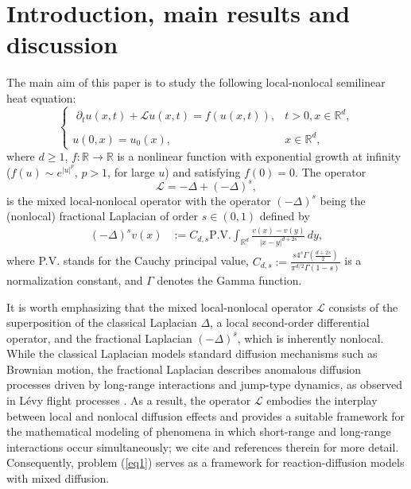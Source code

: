 \documentclass[a4paper,11pt]{amsart}
\renewcommand\eqref[1]{(\ref{#1})} %
\numberwithin{equation}{section}
\theoremstyle{plain}
\theoremstyle{definition}
\begin{document}
\section{Introduction, main results and discussion}
The main aim of this paper is to study the following local-nonlocal semilinear heat equation: 
\begin{equation}\label{eq1}
\left\{\begin{array}{ll}
\,\, \displaystyle {\partial_tu(x, t)+\mathcal L u(x, t) =f(u(x, t)),} &\displaystyle {t>0,x\in {\mathbb{R}^d},}\\
{}\\
\displaystyle{u(0,x)=  u_0(x),\qquad\qquad}&\displaystyle{x\in {\mathbb{R}^d},}
\end{array}
\right.
\end{equation} 
where $d\geq 1$, $f:\mathbb{R}\rightarrow \mathbb{R}$ is a nonlinear function with exponential growth at infinity ($f(u)\sim e^{|u|^p}$, $p>1$, for large $u$) and satisfying $f(0)=0.$ The operator
$$\mathcal L = -\Delta+(-\Delta)^{s},$$ is the mixed local-nonlocal operator with the operator $(-\Delta)^{s}$ being the (nonlocal) fractional Laplacian of order $s\in (0,1)$ defined by
\begin{align*}
(-\Delta)^{s} v(x) & :=C_{d,s}  \mathrm{P.V.}\int_{\mathbb{R}^d}\frac{v(x)-v(y)}{|x-y|^{d+2s}}\,dy,
\end{align*}
where P.V. stands for the Cauchy principal value, $C_{d,s}:= \frac{s4^{s}\Gamma\left(\frac{d+2s}{2}\right)}{\pi^{d/2}\Gamma(1-s)}$ is a normalization constant, and $\Gamma$ denotes the Gamma function.

It is worth emphasizing that the mixed local-nonlocal operator \(\mathcal{L}\) consists of the superposition of the classical Laplacian \(\Delta\), a local second-order differential operator, and the fractional Laplacian \((-\Delta)^s\), which is inherently nonlocal. While the classical Laplacian models standard diffusion mechanisms such as Brownian motion, the fractional Laplacian describes anomalous diffusion processes driven by long-range interactions and jump-type dynamics, as observed in Lévy flight processes \cite{Dip1,Val}. As a result, the operator \(\mathcal{L}\) embodies the interplay between local and nonlocal diffusion effects and provides a suitable framework for the mathematical modeling of phenomena in which short-range and long-range interactions occur simultaneously; we cite \cite{Dip1, Dip2, Dip3, Dip4} and references therein for more detail. Consequently, problem \eqref{eq1}
 serves as a framework for reaction-diffusion models with mixed diffusion.
 
\end{document}
